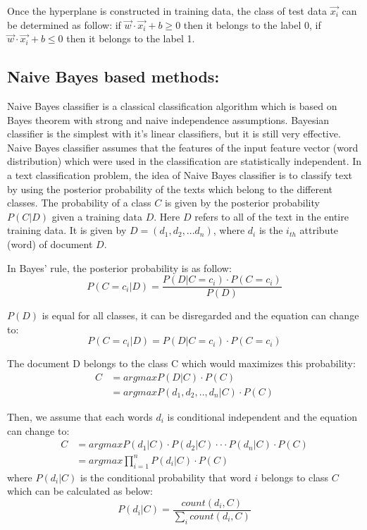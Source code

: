 \documentclass[senior]{IPSstyle}
\begin{document}
Once the hyperplane is constructed  in training data, the class of test data $\vec{x_i}$ can be determined as follow:
if $\vec{w} \cdot \vec{x_i} + b \geq 0$ then it belongs to the label 0, if $\vec{w} \cdot \vec{x_i} + b \leq 0$ then it belongs to the label 1.

\subsection{Naive Bayes based methods:}

Naive Bayes classifier is a classical classification algorithm which is based on Bayes theorem with strong and naive independence assumptions.  Bayesian classifier is the simplest with it's linear classifiers, but it is still very effective. Naive Bayes classifier assumes that the features of
the input feature vector (word distribution) which were used in the classification are statistically independent\cite{brucher2002document}. In a text classification problem, the idea of Naive Bayes classifier is to classify text by using the posterior probability of the texts which belong to the different classes. The probability of a class $C$ is given by the posterior probability $P(C|D)$ given a training data $D$. Here $D$ refers to all of the text in the entire training data. It is given by $D=(d_1, d_2,...d_n)$, where $d_i$ is the $i_{th}$ attribute (word) of document $D$.

In Bayes' rule, the posterior probability is as follow:
\begin{equation}
P(C=c_i | D) = \frac{P(D | C=c_i) \cdot P(C=c_i)}{P(D)}
\end{equation}

$P(D)$ is equal for all classes, it can be disregarded and the equation can change to:
\begin{equation}
P(C=c_i | D) = P(D | C=c_i) \cdot P(C=c_i)
\end{equation}

The document D belongs to the class C which would maximizes this probability:
\begin{equation}
\begin{split}
C &= argmax P(D|C) \cdot P(C) \\
& = argmax P(d_1, d_2, ..,d_n|C) \cdot P(C)
\end{split}
\end{equation}

Then, we assume that each words $d_i$ is conditional independent and the equation can change to:
\begin{equation}
\begin{split}
C &= argmax P(d_1|C) \cdot P(d_2|C) \cdot \cdot \cdot P(d_n|C) \cdot P(C) \\
& = argmax \prod_{i=1}^{n} P(d_i|C) \cdot P(C)
\end{split}
\end{equation}
where $P(d_i | C)$ is the conditional probability that word $i$ belongs to class $C$ which can be calculated as below:
\begin{equation}
P(d_i | C) = \frac{count(d_i, C)}{\sum_i count(d_i, C)}
\end{equation}
\end{document}
